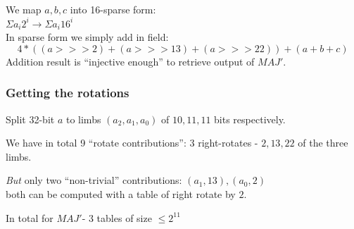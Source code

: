 \documentclass[shadesubsections,compress,14pt,mathserif]{beamer}
\newcommand{\defeq}{\ensuremath{:=}}
\begin{document}
\begin{frame}

We map $a,b,c$ into 16-sparse form:\\
$\Sigma a_i 2^i\rightarrow\Sigma a_i 16^i$ \\ \pause
\vspace{0.2in}
In sparse form we simply add in field:\\
\[4*(  (a>>>2)+(a>>>13)+(a>>>22) ) + (a+b+c)\]\pause
Addition result is ``injective enough'' to retrieve output of $MAJ'$.
\end{frame}
% 
\begin{frame}
\frametitle{Getting the rotations}   
Split 32-bit $a$ to limbs $(a_2,a_1,a_0)$ of $10,11,11$ bits respectively.\\ \pause

\vspace{0.2in}
We have in total 9 ``rotate contributions'': 3 right-rotates  - $2,13,22$ of the three limbs.\\ \pause

\vspace{0.2in}
\emph{But} only two ``non-trivial'' contributions: $(a_1,13),(a_0,2)$ \\ \pause
both can be computed with a table of right rotate by $2$.\\ \pause

\vspace{0.2in}
In total for $MAJ'$- 3 tables of size  $\leq 2^{11}$

\end{frame}
\end{document}
